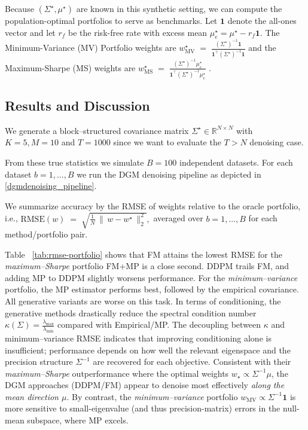 \documentclass{article}
\begin{document}
Because $(\Sigma^\star,\mu^\star)$ are known in this synthetic setting, we can compute the population-optimal portfolios to serve as benchmarks. Let $\mathbf{1}$ denote the all-ones vector and let $r_f$ be the risk-free rate with excess mean $\mu_e^\star=\mu^\star - r_f \mathbf{1}$.
The Minimum-Variance (MV) Portfolio weights are 
$w_{\mathrm{MV}}^\star \;=\; \frac{(\Sigma^\star)^{-1} \mathbf{1}}{\mathbf{1}^\top (\Sigma^\star)^{-1}\mathbf{1}}$ and the Maximum-Sharpe (MS) weights are $w_{\mathrm{MS}}^\star \;=\; \frac{(\Sigma^\star)^{-1} \mu_e^\star}{\mathbf{1}^\top (\Sigma^\star)^{-1} \mu_e^\star}$ \cite{RiskAssetAllocation2005}.



\subsection{Results and Discussion}

We generate a block–structured covariance matrix $\Sigma^\star \in \mathbb{R}^{N\times N}$ with $K=5, M=10$ and $T=1000$ since we want to evaluate the $T>N$ denoising case. 

From these true statistics we simulate $B=100$ independent datasets. For each dataset $b=1,\dots,B$ we run the DGM denoising pipeline as depicted in \ref{dgmdenoising_pipeline}.

We summarize accuracy by the RMSE of weights relative to the oracle portfolio, i.e., $\mathrm{RMSE}(w) \;=\;\sqrt{\frac{1}{N}\,\bigl\|\,w - w^\star\,\bigr\|_2^2},$ averaged over $b=1,\dots,B$ for each method/portfolio pair.

Table~ \ref{tab:rmse-portfolio} shows that  FM  attains the lowest RMSE for the \emph{maximum–Sharpe} portfolio FM+MP is a close second. DDPM trails FM, and adding MP to DDPM slightly worsens performance.
For the \emph{minimum–variance} portfolio, the  MP  estimator performs best, followed by the empirical covariance. All generative variants are worse on this task.
\noindent In terms of conditioning, the generative methods drastically reduce the spectral
condition number \( \kappa(\Sigma)= \frac{\lambda_{\max}}{\lambda_{\min}} \) compared with Empirical/MP.
\noindent The decoupling between \( \kappa \) and minimum–variance RMSE indicates that improving
conditioning alone is insufficient; performance depends on how well the relevant eigenspace and the
precision structure \( \Sigma^{-1} \) are recovered for each objective.
Consistent with their \emph{maximum–Sharpe} outperformance where the optimal weights
\( w_{\star} \propto \Sigma^{-1}\mu \), the  DGM  approaches (DDPM/FM) appear to denoise
most effectively \emph{along the mean direction \( \mu \)}.
By contrast, the \emph{minimum–variance} portfolio
\( w_{\mathrm{MV}} \propto \Sigma^{-1}\mathbf{1} \) is more sensitive to small-eigenvalue
(and thus precision-matrix) errors in the null-mean subspace, where  MP  excels.
\end{document}

